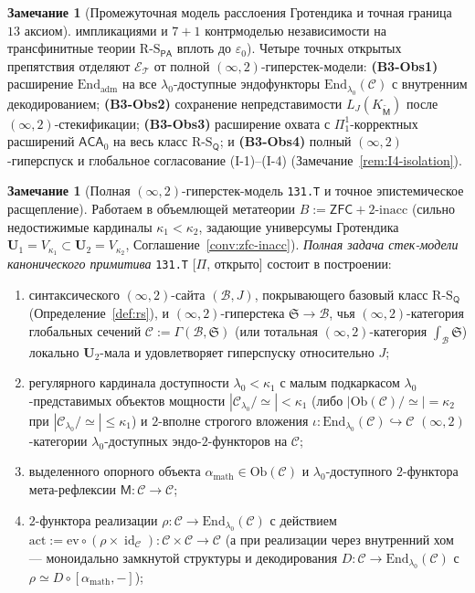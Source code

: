 \documentclass[11pt]{article}
\theoremstyle{plain}
\theoremstyle{definition}
\newtheorem{remark}[theorem]{Замечание}
\newcommand{\RS}{\mathrm{R\text{-}S}}
\newcommand{\cC}{\mathcal{C}}
\newcommand{\Ob}{\mathrm{Ob}}
\newcommand{\PA}{\mathsf{PA}}
\newcommand{\ZFC}{\mathsf{ZFC}}
\DeclareMathOperator{\id}{id}
\begin{document}
\begin{remark}[Промежуточная модель расслоения Гротендика и точная граница $13$ аксиом]
импликациями и $7+1$ контрмоделью независимости на трансфинитные теории $\RS_{\PA}$ вплоть до $\varepsilon_0$). Четыре точных открытых препятствия отделяют $\mathcal{E}_{\mathcal{T}}$ от полной $(\infty, 2)$-гиперстек-модели: \textbf{(B3-Obs1)} расширение $\mathrm{End}_{\mathrm{adm}}$ на все $\lambda_0$-доступные эндофункторы $\mathrm{End}_{\lambda_0}(\cC)$ с внутренним декодированием; \textbf{(B3-Obs2)} сохранение непредставимости $L_J(K_{\widetilde{\mathsf{M}}})$ после $(\infty, 2)$-стекификации; \textbf{(B3-Obs3)} расширение охвата с $\Pi_1^1$-корректных расширений $\mathsf{ACA}_0$ на весь класс $\RS_{\mathsf{Q}}$; и \textbf{(B3-Obs4)} полный $(\infty, 2)$-гиперспуск и глобальное согласование (I-1)--(I-4) (Замечание~\ref{rem:I4-isolation}).
\end{remark}

\begin{remark}[Полная $(\infty,2)$-гиперстек-модель \texttt{131.T} и точное эпистемическое расщепление]\label{prob:131T}
Работаем в объемлющей метатеории $B := \ZFC + 2\text{-}\mathrm{inacc}$ (сильно недостижимые кардиналы $\kappa_1 < \kappa_2$, задающие универсумы Гротендика $\mathbf{U}_1 = V_{\kappa_1} \subset \mathbf{U}_2 = V_{\kappa_2}$, Соглашение~\ref{conv:zfc-inacc}). \emph{Полная задача стек-модели канонического примитива} \texttt{131.T} \textup{[\textbf{$\Pi$}, открыто]} состоит в построении:
\begin{enumerate}[nosep,label=(\arabic*)]
\item синтаксического $(\infty,2)$-сайта $(\mathcal{B}, J)$, покрывающего базовый класс $\RS_{\mathsf{Q}}$ (Определение~\ref{def:rs}), и $(\infty,2)$-гиперстека $\mathfrak{S} \to \mathcal{B}$, чья $(\infty,2)$-категория глобальных сечений $\cC := \Gamma(\mathcal{B}, \mathfrak{S})$ (или тотальная $(\infty,2)$-категория $\int_{\mathcal{B}} \mathfrak{S}$) локально $\mathbf{U}_2$-мала и удовлетворяет гиперспуску относительно $J$;
\item регулярного кардинала доступности $\lambda_0 < \kappa_1$ с малым подкаркасом $\lambda_0$-представимых объектов мощности $|\cC_{\lambda_0}/\!\simeq| < \kappa_1$ (либо $|\Ob(\cC)/\!\simeq| = \kappa_2$ при $|\cC_{\lambda_0}/\!\simeq| \le \kappa_1$) и $2$-вполне строгого вложения $\iota : \mathrm{End}_{\lambda_0}(\cC) \hookrightarrow \cC$ $(\infty,2)$-категории $\lambda_0$-доступных эндо-$2$-функторов на $\cC$;
\item выделенного опорного объекта $\alpha_{\mathrm{math}} \in \Ob(\cC)$ и $\lambda_0$-доступного $2$-функтора мета-рефлексии $\mathsf{M} : \cC \to \cC$;
\item $2$-функтора реализации $\rho : \cC \to \mathrm{End}_{\lambda_0}(\cC)$ с действием $\mathrm{act} := \mathrm{ev} \circ (\rho \times \id_{\cC}) : \cC \times \cC \to \cC$ (а при реализации через внутренний хом — моноидально замкнутой структуры и декодирования $D : \cC \to \mathrm{End}_{\lambda_0}(\cC)$ с $\rho \simeq D \circ [\alpha_{\mathrm{math}}, -]$);

\end{enumerate}
\end{remark}
\end{document}
